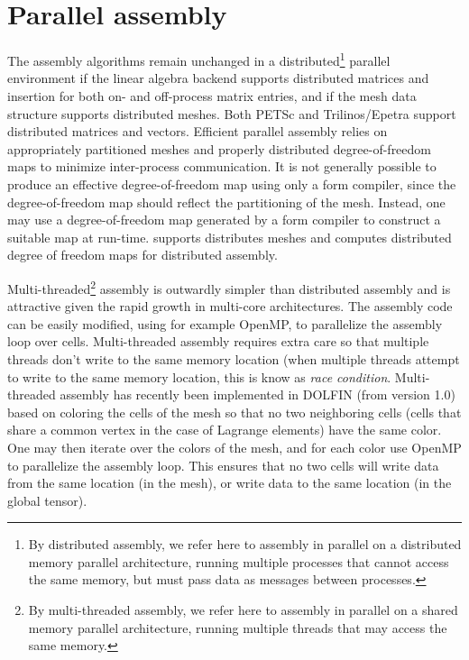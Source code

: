 \section{Parallel assembly}

The assembly algorithms remain unchanged in a distributed\footnote{By
  distributed assembly, we refer here to assembly in parallel on a
  distributed memory parallel architecture, running multiple processes
  that cannot access the same memory, but must pass data as messages
  between processes.} parallel environment if the linear algebra
backend supports distributed matrices and insertion for both on- and
off-process matrix entries, and if the mesh data structure supports
distributed meshes. Both PETSc
\citep{BalayBuschelmanGroppEtAl2001,BalayBuschelmanEijkhoutEtAl2004}
and Trilinos/Epetra \citep{HerouxBartlettHowleEtAl2005} support
distributed matrices and vectors. Efficient parallel assembly relies
on appropriately partitioned meshes and properly distributed
degree-of-freedom maps to minimize inter-process communication.  It is
not generally possible to produce an effective degree-of-freedom map
using only a form compiler, since the degree-of-freedom map should
reflect the partitioning of the mesh. Instead, one may use a
degree-of-freedom map generated by a form compiler to construct a
suitable map at run-time.  \dolfin{} supports distributes meshes and
computes distributed degree of freedom maps for distributed assembly.

Multi-threaded\footnote{By multi-threaded assembly, we refer here to
  assembly in parallel on a shared memory parallel architecture,
  running multiple threads that may access the same memory.} assembly
  is outwardly simpler than distributed assembly and is attractive
  given the rapid growth in multi-core architectures. The assembly
  code can be easily modified, using for example OpenMP, to
  parallelize the assembly loop over cells. Multi-threaded assembly
  requires extra care so that multiple threads don't write to the same
  memory location (when multiple threads attempt to write to the same
  memory location, this is know as \emph{race condition}.
  Multi-threaded assembly has recently been implemented in DOLFIN
  (from version 1.0) based on coloring the cells of the mesh so that
  no two neighboring cells (cells that share a common vertex in the
  case of Lagrange elements) have the same color. One may then iterate
  over the colors of the mesh, and for each color use OpenMP to
  parallelize the assembly loop. This ensures that no two cells will
  write data from the same location (in the mesh), or write data to
  the same location (in the global tensor).

